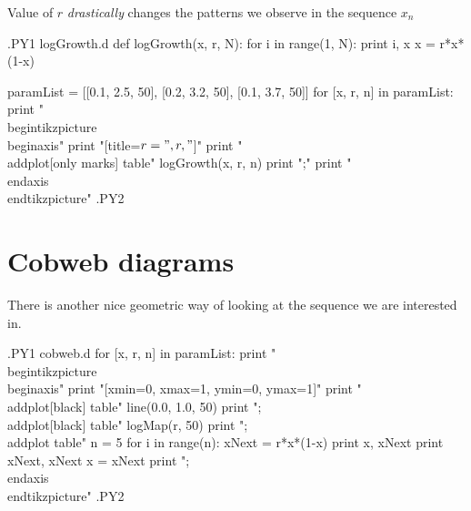 \documentclass{article}
\begin{document}
Value of $r$
\emph{drastically} changes the patterns
we observe in the sequence $x_n$

\begin{center}
.PY1 logGrowth.d
def logGrowth(x, r, N):
	for i in range(1, N):
		print i, x
		x = r*x*(1-x)

paramList = [[0.1, 2.5, 50], [0.2, 3.2, 50], [0.1, 3.7, 50]]
for [x, r, n] in paramList:
	print "\\begin{tikzpicture}\n\\begin{axis}"
	print "[title={$r=", r, "$}]"
	print "\\addplot[only marks] table{"
	logGrowth(x, r, n)
	print "};"
	print "\\end{axis}\n\\end{tikzpicture}\n"
.PY2
\end{center}


\section{Cobweb diagrams}

There is another nice geometric way
of looking at the sequence we are interested in.

\begin{center}
.PY1 cobweb.d
for [x, r, n] in paramList:
	print "\\begin{tikzpicture}\n\\begin{axis}\n"
	print "[xmin=0, xmax=1, ymin=0, ymax=1]"
	print "\\addplot[black] table{"
	line(0.0, 1.0, 50)
	print "};\\addplot[black] table{"
	logMap(r, 50)
	print "};\\addplot table{\n"
	n = 5
	for i in range(n):
		xNext = r*x*(1-x)
		print x, xNext
		print xNext, xNext
		x = xNext
	print "};\\end{axis}\n\\end{tikzpicture}\n"
.PY2
\end{center}
\end{document}
